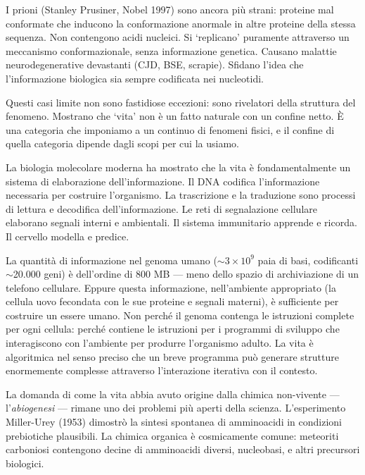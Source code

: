 \documentclass[12pt,a4paper,openany]{book}
\newcommand{\sezione}[1]{\vspace{1.2em}{\large\bfseries #1}\vspace{0.5em}\par}
\begin{document}
I prioni (Stanley Prusiner, Nobel 1997) sono ancora più strani: proteine mal conformate che inducono la conformazione anormale in altre proteine della stessa sequenza. Non contengono acidi nucleici. Si `replicano' puramente attraverso un meccanismo conformazionale, senza informazione genetica. Causano malattie neurodegenerative devastanti (CJD, BSE, scrapie). Sfidano l'idea che l'informazione biologica sia sempre codificata nei nucleotidi.

Questi casi limite non sono fastidiose eccezioni: sono rivelatori della struttura del fenomeno. Mostrano che `vita' non è un fatto naturale con un confine netto. È una categoria che imponiamo a un continuo di fenomeni fisici, e il confine di quella categoria dipende dagli scopi per cui la usiamo.

\sezione{La biologia come fisica dell'informazione}

La biologia molecolare moderna ha mostrato che la vita è fondamentalmente un sistema di elaborazione dell'informazione. Il DNA codifica l'informazione necessaria per costruire l'organismo. La trascrizione e la traduzione sono processi di lettura e decodifica dell'informazione. Le reti di segnalazione cellulare elaborano segnali interni e ambientali. Il sistema immunitario apprende e ricorda. Il cervello modella e predice.

La quantità di informazione nel genoma umano ($\sim$$3 \times 10^9$ paia di basi, codificanti $\sim$20.000 geni) è dell'ordine di 800 MB --- meno dello spazio di archiviazione di un telefono cellulare. Eppure questa informazione, nell'ambiente appropriato (la cellula uovo fecondata con le sue proteine e segnali materni), è sufficiente per costruire un essere umano. Non perché il genoma contenga le istruzioni complete per ogni cellula: perché contiene le istruzioni per i programmi di sviluppo che interagiscono con l'ambiente per produrre l'organismo adulto. La vita è algoritmica nel senso preciso che un breve programma può generare strutture enormemente complesse attraverso l'interazione iterativa con il contesto.

\sezione{L'abiogenesi come problema aperto}

La domanda di come la vita abbia avuto origine dalla chimica non-vivente --- l'\textit{abiogenesi} --- rimane uno dei problemi più aperti della scienza. L'esperimento Miller-Urey (1953) dimostrò la sintesi spontanea di amminoacidi in condizioni prebiotiche plausibili. La chimica organica è cosmicamente comune: meteoriti carboniosi contengono decine di amminoacidi diversi, nucleobasi, e altri precursori biologici.
\end{document}
